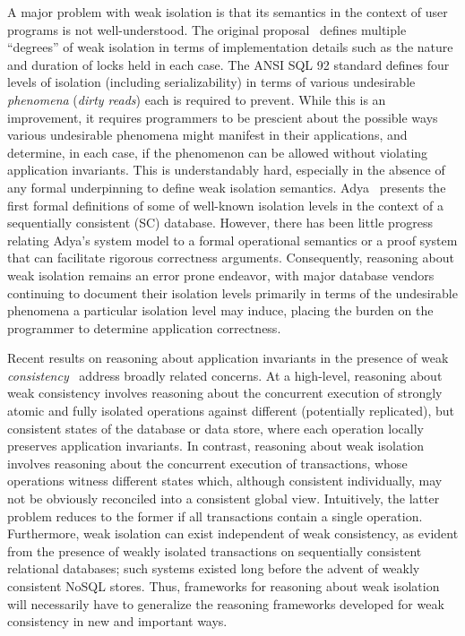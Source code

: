 A major problem with weak isolation is that its semantics in the
context of user programs is not well-understood. The original
proposal~\cite{gray1976} defines multiple ``degrees'' of weak
isolation in terms of implementation details such as the nature and
duration of locks held in each case. The ANSI SQL 92 standard defines
four levels of isolation (including serializability) in terms of
various undesirable \emph{phenomena} (\eg \emph{dirty reads}) each is
required to prevent. While this is an improvement, it requires
programmers to be prescient about the possible ways various
undesirable phenomena might manifest in their applications, and
determine, in each case, if the phenomenon can be allowed without
violating application invariants. This is understandably hard,
especially in the absence of any formal underpinning to define weak
isolation semantics.  Adya~\cite{adyaphd} presents the first formal
definitions of some of well-known isolation levels in the context of a
sequentially consistent (SC) database.  However, there has been little
progress relating Adya's system model to a formal operational
semantics or a proof system that can facilitate rigorous correctness
arguments.  Consequently, reasoning about weak isolation remains an
error prone endeavor, with major database vendors~\cite{postgresiso,
  mysqliso, oracleiso} continuing to document their isolation levels
primarily in terms of the undesirable phenomena a particular isolation
level may induce, placing the burden on the programmer to determine
application correctness.

Recent results on reasoning about application invariants in the
presence of weak \emph{consistency}~\cite{burckhardt14, redblueosdi,
  redblueatc, ecinec, gotsmanpopl16} address broadly related concerns.
At a high-level, reasoning about weak consistency involves reasoning
about the concurrent execution of strongly atomic and fully isolated
operations against different (potentially replicated), but consistent
states of the database or data store, where each operation locally
preserves application invariants. In contrast, reasoning about weak
isolation involves reasoning about the concurrent execution of
transactions, whose operations witness different states which,
although consistent individually, may not be obviously reconciled into
a consistent global view.  Intuitively, the latter problem reduces to
the former if all transactions contain a single
operation. Furthermore, weak isolation can exist independent of weak
consistency, as evident from the presence of weakly isolated
transactions on sequentially consistent relational databases; such
systems existed long before the advent of weakly consistent NoSQL
stores.  Thus, frameworks for reasoning about weak isolation will
necessarily have to generalize the reasoning frameworks developed for
weak consistency in new and important ways.


